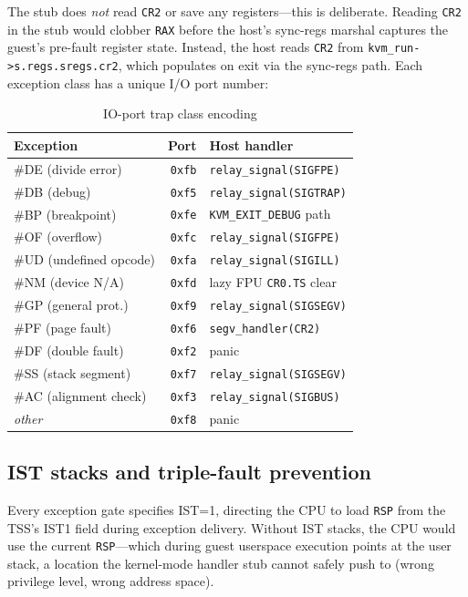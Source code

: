 The stub does \emph{not} read \texttt{CR2} or save any registers---this is
deliberate.  Reading \texttt{CR2} in the stub would clobber \texttt{RAX}
before the host's sync-regs marshal captures the guest's pre-fault register
state.  Instead, the host reads \texttt{CR2} from
\texttt{kvm\_run->s.regs.sregs.cr2}, which \KVM{} populates on exit via the
sync-regs path.  Each exception class has a unique I/O port number:

\begin{table}[ht]
\centering
\caption{IO-port trap class encoding}
\label{tab:iotrap-ports}
\begin{tabular}{lrl}
\toprule
\textbf{Exception} & \textbf{Port} & \textbf{Host handler} \\
\midrule
\#DE (divide error)     & \texttt{0xfb} & \texttt{relay\_signal(SIGFPE)} \\
\#DB (debug)            & \texttt{0xf5} & \texttt{relay\_signal(SIGTRAP)} \\
\#BP (breakpoint)       & \texttt{0xfe} & \texttt{KVM\_EXIT\_DEBUG} path \\
\#OF (overflow)         & \texttt{0xfc} & \texttt{relay\_signal(SIGFPE)} \\
\#UD (undefined opcode) & \texttt{0xfa} & \texttt{relay\_signal(SIGILL)} \\
\#NM (device N/A)       & \texttt{0xfd} & lazy FPU \texttt{CR0.TS} clear \\
\#GP (general prot.)    & \texttt{0xf9} & \texttt{relay\_signal(SIGSEGV)} \\
\#PF (page fault)       & \texttt{0xf6} & \texttt{segv\_handler(CR2)} \\
\#DF (double fault)     & \texttt{0xf2} & panic \\
\#SS (stack segment)    & \texttt{0xf7} & \texttt{relay\_signal(SIGSEGV)} \\
\#AC (alignment check)  & \texttt{0xf3} & \texttt{relay\_signal(SIGBUS)} \\
\textit{other}          & \texttt{0xf8} & panic \\
\bottomrule
\end{tabular}
\end{table}

\subsection{IST stacks and triple-fault prevention}

Every exception gate specifies IST=1, directing the CPU to load \texttt{RSP}
from the TSS's IST1 field during exception delivery.  Without IST stacks,
the CPU would use the current \texttt{RSP}---which during guest userspace
execution points at the user stack, a location the kernel-mode handler
stub cannot safely push to (wrong privilege level, wrong address space).

